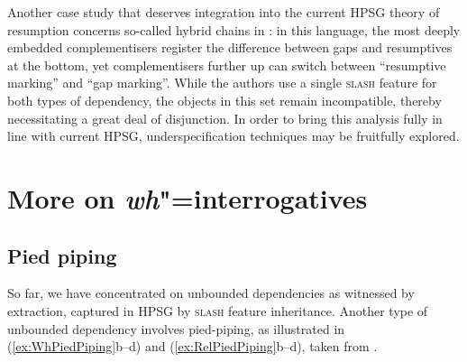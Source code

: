 \documentclass[output=paper,biblatex,babelshorthands,newtxmath,draftmode,colorlinks,citecolor=brown]{langscibook}
\begin{document}
Another case study that deserves integration into the current HPSG
theory of resumption concerns so-called hybrid chains in 
\citep{assmann10:_does_chain_hybrid_irish_suppor}: in this language,
the most deeply embedded complementisers register the difference
between gaps and resumptives at the bottom, yet complementisers
further up can switch between ``resumptive marking'' and ``gap
marking''. While the authors use a single \textsc{slash} feature for
both types of dependency, the objects in this set remain incompatible,
thereby necessitating a great deal of disjunction. In order to bring
this analysis fully in line with current HPSG, underspecification
techniques may be fruitfully explored.



\section{More on \emph{wh}"=interrogatives}
\label{sec:UDC:MoreWh}

\subsection{Pied piping}

So far, we have concentrated on unbounded dependencies as witnessed by
extraction, captured in HPSG by \textsc{slash} feature
inheritance. Another type of unbounded dependency involves
pied-piping, as illustrated in (\ref{ex:WhPiedPiping}b--d) and
(\ref{ex:RelPiedPiping}b--d), taken from \citet[184]{Ginzburg:Sag:01}.

\begin{exe}
  \ex \label{ex:WhPiedPiping}
  \begin{xlist}
  \end{xlist}
\end{exe}
\end{document}
